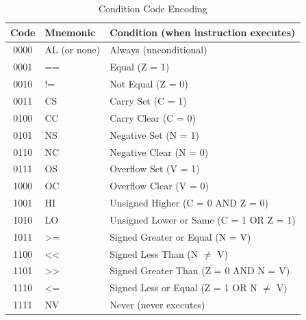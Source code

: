 \begin{table}[H]
	\centering
	\small
	\begin{tabular}{clp{7cm}}
		\toprule
		\textbf{Code} & \textbf{Mnemonic} & \textbf{Condition (when instruction executes)} \\
		\midrule
		0000          & AL (or none)      & Always (unconditional)                         \\
		0001          & ==                & Equal (Z = 1)                                  \\
		0010          & !=                & Not Equal (Z = 0)                              \\
		0011          & CS                & Carry Set (C = 1)                              \\
		0100          & CC                & Carry Clear (C = 0)                            \\
		0101          & NS                & Negative Set (N = 1)                           \\
		0110          & NC                & Negative Clear (N = 0)                         \\
		0111          & OS                & Overflow Set (V = 1)                           \\
		1000          & OC                & Overflow Clear (V = 0)                         \\
		1001          & HI                & Unsigned Higher (C = 0 AND Z = 0)              \\
		1010          & LO                & Unsigned Lower or Same (C = 1 OR Z = 1)        \\
		1011          & >=                & Signed Greater or Equal (N = V)                \\
		1100          & <<                & Signed Less Than (N $\neq$ V)                  \\
		1101          & >>                & Signed Greater Than (Z = 0 AND N = V)          \\
		1110          & <=                & Signed Less or Equal (Z = 1 OR N $\neq$ V)     \\
		1111          & NV                & Never (never executes)                         \\
		\bottomrule
	\end{tabular}
	\caption{Condition Code Encoding}
	\label{tab:condition-codes}
	\label{tab:condition-code-encoding}
\end{table}

